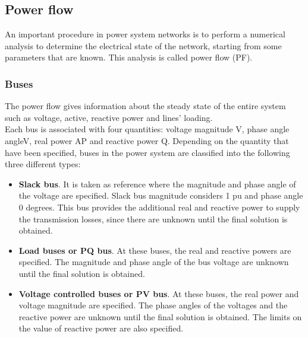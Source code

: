 \subsection{Power flow}
\label{powerflow}
An important procedure in power system networks is to perform a numerical analysis to determine the electrical state of the network, starting from some parameters that are known. This analysis is called power flow (\gls{PF}).\\

\subsubsection{Buses}
The power flow gives information about the steady state of the entire system such as voltage, active, reactive power and lines' loading.\\
Each bus is associated with four quantities: voltage magnitude \gls{V}, phase angle \gls{angleV}, real power \gls{AP} and reactive power \gls{Q}.
Depending on the quantity that have been specified, buses in the power system are classified into the following three different types:
\begin{itemize}
    \item \textbf{Slack bus}. It is taken as reference where the magnitude and phase angle of the voltage are specified. Slack bus magnitude considers 1 \gls{pu} and phase angle 0 degrees. This bus provides the additional real and reactive power to supply the transmission losses, since there are unknown until the final solution is obtained.

    \item \textbf{Load buses or PQ bus}. At these buses, the real and reactive powers are specified. The magnitude and phase angle of the bus voltage are unknown until the final solution is obtained.

    \item \textbf{Voltage controlled buses or PV bus}. At these buses, the real power and voltage magnitude are specified. The phase angles of the voltages and the reactive power are unknown until the final solution is obtained. The limits on the value of reactive power are also specified. 
\end{itemize}

